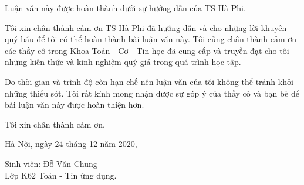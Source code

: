 \thispagestyle{empty}
Luận văn này được hoàn thành dưới sự hướng dẫn của TS Hà Phi.

\medskip
Tôi xin chân thành cảm ơn TS Hà Phi đã hướng dẫn và cho những lời khuyên quý báu để tôi có thể hoàn thành bài luận văn này. Tôi cũng chân thành cảm ơn các thầy cô trong Khoa Toán - Cơ - Tin học đã cung cấp và truyền đạt cho tôi những kiến thức và kinh nghiệm quý giá trong quá trình học tập.

\medskip
Do thời gian và trình độ còn hạn chế nên luận văn của tôi không thể tránh khỏi những thiếu sót. Tôi rất kính mong nhận được sự góp ý của thầy cô và bạn bè để bài luận văn này được hoàn thiện hơn. 

\medskip
Tôi xin chân thành cảm ơn.

\vspace*{1cm}
Hà Nội, ngày 24 tháng 12 năm 2020,

\medskip
Sinh viên: Đỗ Văn Chung \\
Lớp K62 Toán - Tin ứng dụng.